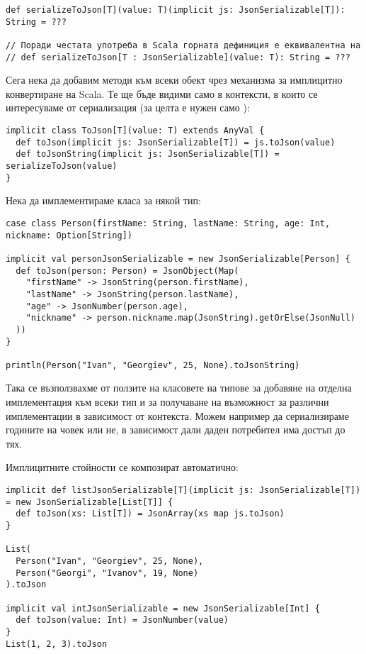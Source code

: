 \begin{lstlisting}[texcl=true]
def serializeToJson[T](value: T)(implicit js: JsonSerializable[T]): String = ???

// Поради честата употреба в Scala горната дефиниция е еквивалентна на
// def serializeToJson[T : JsonSerializable](value: T): String = ???
\end{lstlisting}

Сега нека да добавим  методи към всеки обект чрез механизма за имплицитно конвертиране на Scala. Те ще бъде видими само в контексти, в които се интересуваме от сериализация (за целта е нужен само ):

\begin{lstlisting}
implicit class ToJson[T](value: T) extends AnyVal {
  def toJson(implicit js: JsonSerializable[T]) = js.toJson(value)
  def toJsonString(implicit js: JsonSerializable[T]) = serializeToJson(value)
}
\end{lstlisting}

Нека да имплементираме класа за някой тип:

\begin{lstlisting}
case class Person(firstName: String, lastName: String, age: Int, nickname: Option[String])

implicit val personJsonSerializable = new JsonSerializable[Person] {
  def toJson(person: Person) = JsonObject(Map(
    "firstName" -> JsonString(person.firstName),
    "lastName" -> JsonString(person.lastName),
    "age" -> JsonNumber(person.age),
    "nickname" -> person.nickname.map(JsonString).getOrElse(JsonNull)
  ))
}

println(Person("Ivan", "Georgiev", 25, None).toJsonString)
\end{lstlisting}

Така се възползвахме от ползите на класовете на типове за добавяне на отделна имплементация към всеки тип и за получаване на възможност за различни имплементации в зависимост от контекста. Можем например да сериализираме годините на човек или не, в зависимост дали даден потребител има достъп до тях.

Имплицитните стойности се композират автоматично:

\begin{lstlisting}
implicit def listJsonSerializable[T](implicit js: JsonSerializable[T]) = new JsonSerializable[List[T]] {
  def toJson(xs: List[T]) = JsonArray(xs map js.toJson)
}

List(
  Person("Ivan", "Georgiev", 25, None),
  Person("Georgi", "Ivanov", 19, None)
).toJson

implicit val intJsonSerializable = new JsonSerializable[Int] {
  def toJson(value: Int) = JsonNumber(value)
}
List(1, 2, 3).toJson
\end{lstlisting}

